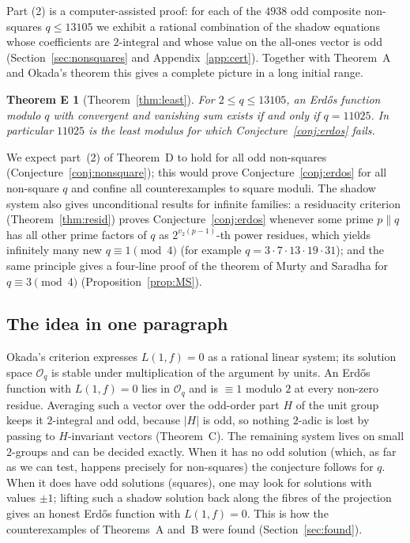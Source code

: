 \documentclass[11pt]{amsart}
\newtheorem*{mainE}{Theorem E}
\theoremstyle{definition}
\theoremstyle{remark}
\newcommand{\Ok}{\mathcal O}
\numberwithin{equation}{section}
\begin{document}
Part (2) is a computer-assisted proof: for each of the $4938$ odd composite non-squares $q\le13105$ we exhibit a rational combination of the shadow equations whose coefficients are $2$-integral and whose value on the all-ones vector is odd (Section~\ref{sec:nonsquares} and Appendix~\ref{app:cert}).
Together with Theorem~A and Okada's theorem this gives a complete picture in a long initial range.

\begin{mainE}[Theorem~\ref{thm:least}]
For $2\le q\le13105$, an Erd\H{o}s function modulo $q$ with convergent and vanishing sum exists if and only if $q=11025$.
In particular $11025$ is the least modulus for which Conjecture~\ref{conj:erdos} fails.
\end{mainE}

We expect part~(2) of Theorem~D to hold for all odd non-squares (Conjecture~\ref{conj:nonsquare}); this would prove Conjecture~\ref{conj:erdos} for all non-square $q$ and confine all counterexamples to square moduli.
The shadow system also gives unconditional results for infinite families: a residuacity criterion (Theorem~\ref{thm:resid}) proves Conjecture~\ref{conj:erdos} whenever some prime $p\parallel q$ has all other prime factors of $q$ as $2^{v_2(p-1)}$-th power residues, which yields infinitely many new $q\equiv1\pmod4$ (for example $q=3\cdot7\cdot13\cdot19\cdot31$); and the same principle gives a four-line proof of the theorem of Murty and Saradha for $q\equiv3\pmod4$ (Proposition~\ref{prop:MS}).

\subsection{The idea in one paragraph}
Okada's criterion expresses $L(1,f)=0$ as a rational linear system; its solution space $\Ok_q$ is stable under multiplication of the argument by units.
An Erd\H{o}s function with $L(1,f)=0$ lies in $\Ok_q$ and is $\equiv1$ modulo $2$ at every non-zero residue.
Averaging such a vector over the odd-order part $H$ of the unit group keeps it $2$-integral and odd, because $|H|$ is odd, so nothing $2$-adic is lost by passing to $H$-invariant vectors (Theorem~C).
The remaining system lives on small $2$-groups and can be decided exactly.
When it has no odd solution (which, as far as we can test, happens precisely for non-squares) the conjecture follows for $q$.
When it does have odd solutions (squares), one may look for solutions with values $\pm1$; lifting such a shadow solution back along the fibres of the projection gives an honest Erd\H{o}s function with $L(1,f)=0$.
This is how the counterexamples of Theorems~A and~B were found (Section~\ref{sec:found}).
\end{document}
